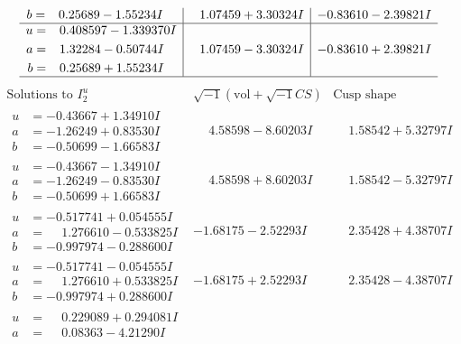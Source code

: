 \documentclass[1p]{elsarticle_modified}
\theoremstyle{definition}
\newcommand{\I}{\sqrt{-1}}
\begin{document}
$$\begin{array}{c|c|c}
\begin{aligned}
b &= \phantom{-}0.25689 - 1.55234 I\end{aligned}
 & \phantom{-}1.07459 + 3.30324 I & -0.83610 - 2.39821 I \\ \hline\begin{aligned}
u &= \phantom{-}0.408597 - 1.339370 I \\
a &= \phantom{-}1.32284 - 0.50744 I \\
b &= \phantom{-}0.25689 + 1.55234 I\end{aligned}
 & \phantom{-}1.07459 - 3.30324 I & -0.83610 + 2.39821 I\\
 \hline 
 \end{array}$$\newpage$$\begin{array}{c|c|c}  
\text{Solutions to }I^u_{2}& \I (\text{vol} + \sqrt{-1}CS) & \text{Cusp shape}\\
 \hline 
\begin{aligned}
u &= -0.43667 + 1.34910 I \\
a &= -1.26249 + 0.83530 I \\
b &= -0.50699 - 1.66583 I\end{aligned}
 & \phantom{-}4.58598 - 8.60203 I & \phantom{-}1.58542 + 5.32797 I \\ \hline\begin{aligned}
u &= -0.43667 - 1.34910 I \\
a &= -1.26249 - 0.83530 I \\
b &= -0.50699 + 1.66583 I\end{aligned}
 & \phantom{-}4.58598 + 8.60203 I & \phantom{-}1.58542 - 5.32797 I \\ \hline\begin{aligned}
u &= -0.517741 + 0.054555 I \\
a &= \phantom{-}1.276610 - 0.533825 I \\
b &= -0.997974 - 0.288600 I\end{aligned}
 & -1.68175 - 2.52293 I & \phantom{-}2.35428 + 4.38707 I \\ \hline\begin{aligned}
u &= -0.517741 - 0.054555 I \\
a &= \phantom{-}1.276610 + 0.533825 I \\
b &= -0.997974 + 0.288600 I\end{aligned}
 & -1.68175 + 2.52293 I & \phantom{-}2.35428 - 4.38707 I \\ \hline\begin{aligned}
u &= \phantom{-}0.229089 + 0.294081 I \\
a &= \phantom{-}0.08363 - 4.21290 I \\

\end{aligned}
\end{array}$$
\end{document}
